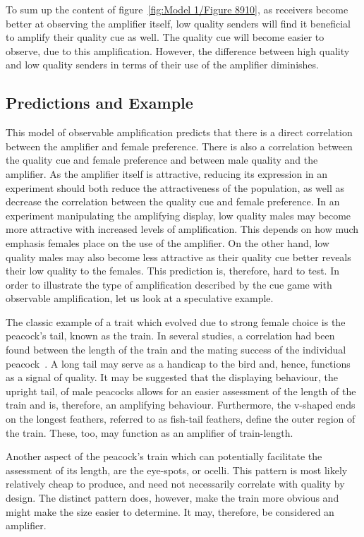 \documentclass[a4paper,12pt]{article}
\numberwithin{equation}{section}
\begin{document}
To sum up the content of figure~\ref{fig:Model 1/Figure 8910}, as receivers become better at observing the amplifier itself, low quality senders will find it beneficial to amplify their quality cue as well. The quality cue will become easier to observe, due to this amplification. However, the difference between high quality and low quality senders in terms of their use of the amplifier diminishes.


\subsection{Predictions and Example}
\label{sec:Cue Game with Observable Amplification/Example}

This model of observable amplification predicts that there is a direct correlation between the amplifier and female preference. There is also a correlation between the quality cue and female preference and between male quality and the amplifier. As the amplifier itself is attractive, reducing its expression in an experiment should both reduce the attractiveness of the population, as well as decrease the correlation between the quality cue and female preference. In an experiment manipulating the amplifying display, low quality males may become more attractive with increased levels of amplification. This depends on how much emphasis females place on the use of the amplifier. On the other hand, low quality males may also become less attractive as their quality cue better reveals their low quality to the females. This prediction is, therefore, hard to test. In order to illustrate the type of amplification described by the cue game with observable amplification, let us look at a speculative example.

The classic example of a trait which evolved due to strong female choice is the peacock's tail, known as the train. In several studies, a correlation had been found between the length of the train and the mating success of the individual peacock~\cite{Yasmin1996, Petrie1991}. A long tail may serve as a handicap to the bird and, hence, functions as a signal of quality. It may be suggested that the displaying behaviour, the upright tail, of male peacocks allows for an easier assessment of the length of the train and is, therefore, an amplifying behaviour. Furthermore, the v-shaped ends on the longest feathers, referred to as fish-tail feathers, define the outer region of the train. These, too, may function as an amplifier of train-length.

Another aspect of the peacock's train which can potentially facilitate the assessment of its length, are the eye-spots, or ocelli. This pattern is most likely relatively cheap to produce, and need not necessarily correlate with quality by design. The distinct pattern does, however, make the train more obvious and might make the size easier to determine. It may, therefore, be considered an amplifier.
\end{document}
